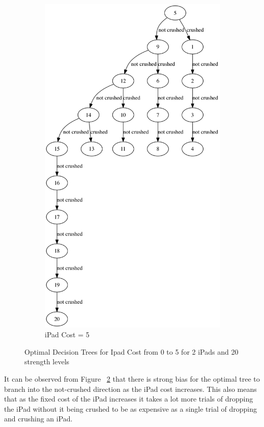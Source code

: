 \documentclass[12pt,a4paper,oneside]{report}
\begin{document}
\begin{figure}[H]
\begin{subfigure}{0.3\textwidth}
		\includegraphics[width=\textwidth]{fixed_cost_5}
		\caption{iPad Cost = 5}
		\label{fig:fixed_cost_5}
	\end{subfigure}
	\caption{Optimal Decision Trees for Ipad Cost from 0 to 5 for 2 iPads and 20 strength levels}
	\label{fixed_cost_tree}
\end{figure}

It can be observed from Figure ~\ref{fixed_cost_tree} that there is strong bias for the optimal tree to branch into the not-crushed direction as the iPad cost increases. This also means that as the fixed cost of the iPad increases it takes a lot more trials of dropping the iPad without it being crushed to be as expensive as a single trial of dropping and crushing an iPad. 
\end{document}
